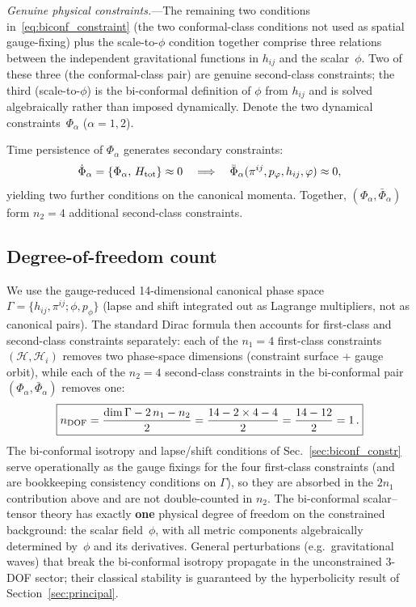 \documentclass[11pt]{article}
\begin{document}
\textit{Genuine physical constraints.}---The remaining two conditions in~\eqref{eq:biconf_constraint} (the two conformal-class conditions not used as spatial gauge-fixing) plus the scale-to-$\phi$ condition together comprise three relations between the independent gravitational functions in $h_{ij}$ and the scalar~$\phi$. Two of these three (the conformal-class pair) are genuine second-class constraints; the third (scale-to-$\phi$) is the bi-conformal definition of $\phi$ from $h_{ij}$ and is solved algebraically rather than imposed dynamically. Denote the two dynamical constraints~$\Phi_\alpha$ ($\alpha=1,2$).

Time persistence of $\Phi_\alpha$ generates secondary constraints:
\begin{equation}
\dot{\Phi}_\alpha
  =\{\Phi_\alpha,\,H_{\rm tot}\}\approx 0
  \quad\Longrightarrow\quad
  \bar{\Phi}_\alpha(\pi^{ij},p_\phi,h_{ij},\phi)\approx 0,
\label{eq:secondary}
\end{equation}
yielding two further conditions on the canonical momenta.  Together, $(\Phi_\alpha,\bar{\Phi}_\alpha)$ form $n_2=4$ additional second-class constraints.

\subsection{Degree-of-freedom count}\label{sec:dof_count}

We use the gauge-reduced 14-dimensional canonical phase space $\Gamma=\{h_{ij},\pi^{ij};\phi,p_\phi\}$ (lapse and shift integrated out as Lagrange multipliers, not as canonical pairs). The standard Dirac formula then accounts for first-class and second-class constraints separately: each of the $n_1=4$ first-class constraints $(\mathcal H,\mathcal H_i)$ removes two phase-space dimensions (constraint surface + gauge orbit), while each of the $n_2=4$ second-class constraints in the bi-conformal pair $(\Phi_\alpha,\bar\Phi_\alpha)$ removes one:
\begin{equation}
\boxed{
n_{\rm DOF}
  =\frac{\dim\Gamma - 2\,n_1 - n_2}{2}
  =\frac{14-2\times 4-4}{2}
  =\frac{14-12}{2}
  =1\,.}
\label{eq:dof_constrained}
\end{equation}
The bi-conformal isotropy and lapse/shift conditions of Sec.~\ref{sec:biconf_constr} serve operationally as the gauge fixings for the four first-class constraints (and are bookkeeping consistency conditions on $\Gamma$), so they are absorbed in the $2n_1$ contribution above and are not double-counted in $n_2$.
The bi-conformal scalar--tensor theory has exactly \textbf{one} physical degree of freedom on the constrained background: the scalar field~$\phi$, with all metric components algebraically determined by~$\phi$ and its derivatives.  General perturbations (e.g.\ gravitational waves) that break the bi-conformal isotropy propagate in the unconstrained 3-DOF sector; their classical stability is guaranteed by the hyperbolicity result of Section~\ref{sec:principal}.
\end{document}
